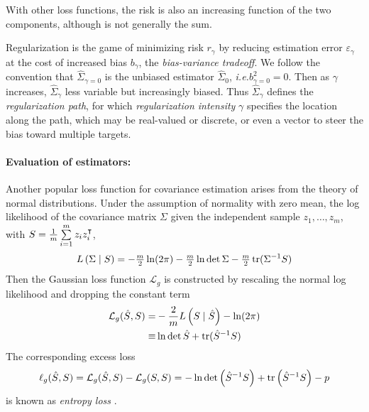 With other loss functions, the risk is also an increasing function of the two components, although is not generally the sum.

Regularization is the game of minimizing risk $r_\gamma$ by reducing estimation error $\varepsilon_\gamma$ at the cost of increased bias $b_\gamma$, the \emph{bias-variance tradeoff}.  
We follow the convention that $\hat\Sigma_{\gamma=0}$ is the unbiased estimator $\hat\Sigma_0$, \emph{i.e.}\;$b_{\gamma=0}^2 = 0$.  Then as $\gamma$ increases, $\hat\Sigma_\gamma$ less variable but increasingly biased.  Thus $\hat\Sigma_\gamma$ defines the \emph{regularization path}, for which \emph{regularization intensity} $\gamma$ specifies the location along the path, which may be real-valued or discrete, or even a vector to steer the bias toward multiple targets.  

\paragraph{Evaluation of estimators:}
Another popular loss  function for covariance estimation arises from the theory of normal distributions.  Under the assumption of normality  with zero mean, the log likelihood of the covariance matrix $\Sigma$ given the independent sample $z_1,\ldots,z_m$, with $S = \tfrac 1 m \sum\limits_{i=1}^m z_i z_i^\intercal$,  
\begin{equation}
L\left(\Sigma \mid S\right) = -\tfrac m 2 \ln(2\pi) - \tfrac m 2 \ln \det \Sigma - \tfrac m 2 \operatorname{tr}(\Sigma^{-1} S)
\end{equation}
Then the Gaussian loss function $\mathcal L_g$ is constructed by rescaling the normal log likelihood and dropping the constant term
\begin{equation}
\begin{split}
\mathcal L_g(\hat S,S) = &-\frac 2 m L\left(S \mid \hat S \right) - \ln(2\pi) 
\\ 
\equiv & \ln \det \hat S + \operatorname{tr}(\hat S^{-1} S) 
\end{split}
\end{equation}
The corresponding excess loss 
\begin{equation}
\ell_g(\hat S,S) = \mathcal L_g(\hat S,S) - \mathcal L_g(S,S) 
= -\ln \det \left(\hat S^{-1} S\right) + \operatorname{tr}\left(\hat S^{-1}S\right) - p
\end{equation}
is known as \emph{entropy loss} \citep{James:1961}.

